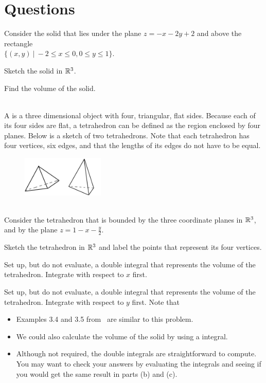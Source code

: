 \documentclass{article}
\begin{document}
\section*{Questions}
\BEN
\item %
Consider the solid that lies under the plane $z = -x-2y+2$ and above the rectangle \\$\{(x,y) \ | \ -2\le x\le 0, 0\le y \le1 \}$.
\BEN
\item Sketch the solid in $\mathbb{R}^3$. 
\item Find the volume of the solid.
\EEN
\item %
 \\
A  is a three dimensional object with four, triangular, flat sides. Because each of its four sides are flat, a tetrahedron can be defined as the region enclosed by four planes. Below is a sketch of two tetrahedrons. Note that each tetrahedron has four vertices, six edges, and that the lengths of its edges do not have to be equal.
\begin{figure}[h]
  \vspace{-1pt}
  \begin{center}
    \includegraphics[width=0.35\textwidth]{ImgTetrahedrons.jpg}
  \end{center}
\end{figure}\\
Consider the tetrahedron that is bounded by the three coordinate planes in $\mathbb{R}^3$, and by the plane $z = 1 - x - \frac{y}{2}$.
\BEN
\item Sketch the tetrahedron in $\mathbb{R}^3$ and label the points that represent its four vertices. 
\item Set up, but do not evaluate, a double integral that represents the volume of the tetrahedron. Integrate with respect to $x$ first. 
\item Set up, but do not evaluate, a double integral that represents the volume of the tetrahedron. Integrate with respect to $y$ first. 
\EEN
Note that
\begin{itemize}
\item Examples 3.4 and 3.5 from \VCT \ are similar to this problem. 
\item We could also calculate the volume of the solid by using a  integral. 
\item Although not required, the double integrals are straightforward to compute. You may want to check your answers by evaluating the integrals and seeing if you would get the same result in parts (b) and (c). 
\end{itemize}
\end{document}
